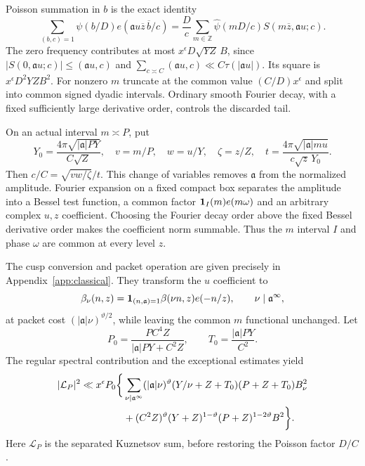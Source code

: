 Poisson summation in $b$ is the exact identity
\[
 \sum_{(b,c)=1}\psi(b/D)e(\mathfrak{a}u\overline z\,\overline b/c)
 =\frac Dc\sum_{m\in\mathbb Z}\widehat\psi(mD/c)
                   S(m\overline z,\mathfrak{a}u;c).
\]
The zero frequency contributes at most
$x^\epsilon D\sqrt{YZ}\,B$, since
$|S(0,\mathfrak{a}u;c)|\le(\mathfrak{a}u,c)$ and
$\sum_{c\asymp C}(\mathfrak{a}u,c)\ll C\tau(|\mathfrak{a}u|)$.
Its square is $x^\epsilon D^2YZB^2$.
For nonzero $m$ truncate at the common value $(C/D)x^\epsilon$ and
split into common signed dyadic intervals. Ordinary smooth Fourier
decay, with a fixed sufficiently large derivative order, controls
the discarded tail.

On an actual interval $m\asymp P$, put
\[
 Y_0=\frac{4\pi\sqrt{|\mathfrak{a}|PY}}{C\sqrt Z},\quad
 v=m/P,\quad w=u/Y,\quad \zeta=z/Z,\quad
 t=\frac{4\pi\sqrt{|\mathfrak{a}|mu}}{c\sqrt z\,Y_0}.
\]
Then $c/C=\sqrt{vw/\zeta}/t$. This change of variables removes $\mathfrak{a}$
from the normalized amplitude. Fourier expansion on a fixed compact
box separates the amplitude into a Bessel test function, a common
factor $\mathbf 1_I(m)e(m\omega)$ and an arbitrary complex $u,z$
coefficient. Choosing the Fourier decay order above the fixed Bessel
derivative order makes the coefficient norm summable. Thus the
$m$ interval $I$ and phase $\omega$ are common at every level $z$.

The cusp conversion and packet operation are given precisely in
Appendix~\ref{app:classical}. They transform the $u$ coefficient to
\begin{equation}
 \beta_\nu(n,z)=\mathbf 1_{(n,\mathfrak{a})=1}\beta(\nu n,z)e(-n/z),
 \qquad \nu\mid \mathfrak{a}^\infty,
 \label{ana:packet-coefficient}
\end{equation}
at packet cost $(|\mathfrak{a}|\nu)^{\vartheta/2}$, while leaving the common
$m$ functional unchanged. Let
\[
 P_0=\frac{PC^4Z}{|\mathfrak{a}|PY+C^2Z},\qquad T_0=\frac{|\mathfrak{a}|PY}{C^2}.
\]
The regular spectral contribution and the exceptional estimates yield
\begin{align}
 |\mathcal L_P|^2\ll x^\epsilon P_0\bigg\{
 &\sum_{\nu\mid \mathfrak{a}^\infty}(|\mathfrak{a}|\nu)^\vartheta
       (Y/\nu+Z+T_0)(P+Z+T_0)B_\nu^2\notag\\
 &+(C^2Z)^\vartheta(Y+Z)^{1-\vartheta}
                    (P+Z)^{1-2\vartheta}B^2\bigg\}.
 \label{ana:spectral-polynomial}
\end{align}
Here $\mathcal L_P$ is the separated Kuznetsov sum, before restoring
the Poisson factor $D/C$.

